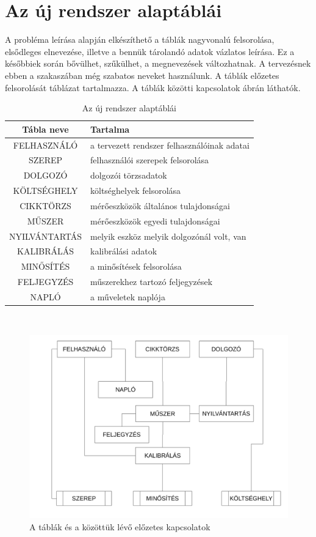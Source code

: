 \documentclass[a4paper,12pt]{report}
\begin{document}
\section{Az új rendszer alaptáblái}
A probléma leírása alapján elkészíthető a táblák nagyvonalú felsorolása, 
elsődleges elnevezése, illetve a bennük tárolandó adatok vázlatos leírása. Ez a 
későbbiek során bővülhet, szűkülhet, a megnevezések változhatnak. A tervezésnek 
ebben a szakaszában még szabatos neveket használunk.
A táblák előzetes felsorolását  táblázat tartalmazza.
A táblák közötti kapcsolatok  ábrán láthatók.
\begin{table}[ht!]
\centering
\begin{tabular}{|c|l|}
\hline
\textbf{Tábla neve}&\textbf{Tartalma}\\
\hline
FELHASZNÁLÓ & a tervezett rendszer felhasználóinak adatai\\
\hline
SZEREP & felhasználói szerepek felsorolása\\
\hline
DOLGOZÓ & dolgozói törzsadatok\\
\hline
KÖLTSÉGHELY & költséghelyek felsorolása\\
\hline
CIKKTÖRZS & mérőeszközök általános tulajdonságai\\
\hline
MŰSZER & mérőeszközök egyedi tulajdonságai\\
\hline
NYILVÁNTARTÁS & melyik eszköz melyik dolgozónál volt, van\\
\hline
KALIBRÁLÁS & kalibrálási adatok\\
\hline
MINŐSÍTÉS & a minősítések felsorolása\\
\hline
FELJEGYZÉS & műszerekhez tartozó feljegyzések\\
\hline
NAPLÓ & a műveletek naplója\\
\hline
\end{tabular}
\caption{Az új rendszer alaptáblái}\label{tablak-0}
\end{table}
\\

\begin{figure}[ht!]\label{tablak0-kapcs0}
\centering
\includegraphics[width=13cm]{kepek/tablak0-kapcs0.png}
\caption{A táblák és a közöttük lévő előzetes kapcsolatok}
\end{figure}
\end{document}

